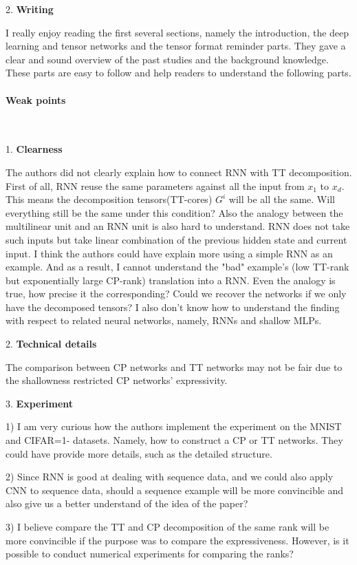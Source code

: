 \documentclass{article}
\begin{document}
2. \textbf{Writing}  

I really enjoy reading the first several sections, namely the introduction, the deep learning and tensor networks and the tensor format reminder parts. They gave a clear and sound overview of the past studies and the background knowledge. These parts are easy to follow and help readers to understand the following parts.

\paragraph{Weak points}  \ 

1. \textbf{Clearness} 

The authors did not clearly explain how to connect RNN with TT decomposition. First of all, RNN reuse the same parameters against all the input from $x_1$ to $x_d$. This means the decomposition tensors(TT-cores) $G^i$ will be all the same. Will everything still be the same under this condition? Also the analogy between the multilinear unit and an RNN unit is also hard to understand. RNN does not take such inputs but take linear combination of the previous hidden state and current input. I think the authors could have explain more using a simple RNN as an example. And as a result, I cannot understand the "bad" example's (low TT-rank but exponentially large CP-rank) translation into a RNN. Even the analogy is true, how precise it the corresponding? Could we recover the networks if we only have the decomposed tensors? I also don't know how to understand the finding with respect to related neural networks, namely, RNNs and shallow MLPs.

2. \textbf{Technical details} 

The comparison between CP networks and TT networks may not be fair due to the shallowness restricted CP networks' expressivity.

3. \textbf{Experiment} 

1) I am very curious how the authors implement the experiment on the MNIST and CIFAR=1- datasets. Namely, how to construct a CP or TT networks. They could have provide more details, such as the detailed structure.

2) Since RNN is good at dealing with sequence data, and we could also apply CNN to sequence data, should a sequence example will be more convincible and also give us a better understand of the idea of the paper?

3) I believe compare the TT and CP decomposition of the same rank will be more convincible if the purpose was to compare the expressiveness. However, is it possible to conduct numerical experiments for comparing the ranks? 

\newpage



\end{document}
